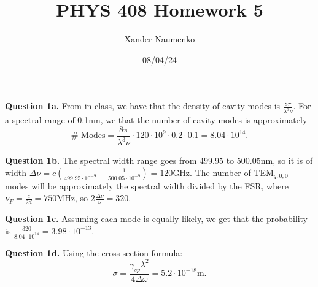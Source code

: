 \documentclass[letterpaper, reqno,11pt]{article}
\begin{document}
\title{PHYS 408 Homework 5}
\date{08/04/24}
\author{Xander Naumenko}
\maketitle


{\medskip\noindent\bf Question 1a.} From in class, we have that the density of cavity modes is $\frac{8\pi}{\lambda^3\nu}$. For a spectral range of 0.1nm, we that the number of cavity modes is approximately
\[
\#\text{ Modes}=\frac{8\pi}{\lambda^3\nu}\cdot 120\cdot 10^{9}\cdot 0.2\cdot 0.1=8.04\cdot 10^{14}
.\]

{\medskip\noindent\bf Question 1b.} The spectral width range goes from $499.95$ to $500.05$nm, so it is of width $\Delta\nu=c \left( \frac{1}{499.95\cdot 10^{-9}}-\frac{1}{500.05\cdot 10^{-9}} \right)=120$GHz. The number of TEM$_{q,0,0}$ modes will be approximately the spectral width divided by the FSR, where $\nu_F=\frac{c}{2d}=750$MHz, so $2\frac{\Delta\nu}{\nu}=320$.

{\medskip\noindent\bf Question 1c.} Assuming each mode is equally likely, we get that the probability is $\frac{320}{8.04\cdot 10^{14}}=3.98\cdot 10^{-13}$.

{\medskip\noindent\bf Question 1d.} Using the cross section formula:
\[
\sigma= \frac{\gamma_{sp}\lambda^2}{4\Delta\omega}=5.2\cdot 10^{-18}\text{m}
.\]

\end{document}
